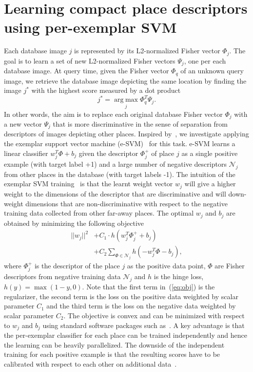 \documentclass[10pt,twocolumn,letterpaper]{article}
\begin{document}
\section{Learning compact place descriptors using per-exemplar SVM}
\label{sec:perExemplar}
   Each database image $j$ is represented by its L2-normalized Fisher vector $\Phi_j$. The goal is to learn a set of new L2-normalized Fisher vectors $\Psi_j$, one per each database image.
   \textcolor{petr}{At query time,} given the Fisher vector $\Phi_q$ of an unknown query image, we retrieve the database image depicting the same location by finding the image $j^*$ with the highest score measured by a dot product
   \begin{equation}
       j^*=\operatorname*{arg\;max}_{j} \Phi_q^T \Psi_j. 
       \label{eq:class}
   \end{equation}
   In other words, the aim is to replace each original database Fisher vector $\Phi_j$ with a new vector $\Psi_j$ that is more discriminative in the sense of separation from descriptors of images depicting other places. Inspired by~\cite{Gronat13}, we investigate applying the exemplar support vector machine (e-SVM)~\cite{Malisiewicz11} for this task. e-SVM learns a linear classifier $w_j^T\Phi+b_j$ given the descriptor $\Phi_j^+$ of place $j$ as a single positive example (with target label +1) and a large number of negative descriptors $\mathcal N_j$ from other places in the database (with target labels -1). The intuition of the exemplar SVM training~\cite{Malisiewicz11} is that the learnt weight vector $w_j$ will give a higher weight to the dimensions of the descriptor that are discriminative and will down-weight dimensions that are non-discriminative with respect to the negative training data collected from other far-away places.  The optimal $w_j$ and $b_j$ are obtained by minimizing the following objective  
      \begin{align}
         \label{eq:obj}
         ||w_j||^{2} &+C_1 \cdot h
            \left(
               w_j^T\Phi^+_j+b_j
            \right)  \\ \nonumber
            &+C_2\sum_{\Phi\in \mathcal N_j}h
            \left(
               -w_j^T\Phi-b_j
            \right),    
      \end{align}
   where $\Phi^+_j$ is the descriptor of the place $j$ as the positive data point, $\Phi$ are Fisher descriptors from negative training data $\mathcal N_j$ and $h$ is the hinge loss, $h(y) = \max(1-y,0)$. Note that the first term in~(\ref{eq:obj}) is the regularizer, the second term is the loss on the positive data weighted by scalar parameter $C_1$ and the third term is the loss on the negative data weighted by scalar parameter $C_2$. The objective is convex and can be minimized with respect to $w_j$ and $b_j$ using standard software packages such as~\cite{libsvm}. A key advantage is that the per-exemplar classifier for each place can be trained independently and hence the learning can be heavily parallelized. The downside of the independent training for each positive example is that the resulting scores have to be calibrated with respect to each other on additional data~\cite{Gronat13,Malisiewicz11}.
   
\end{document}

